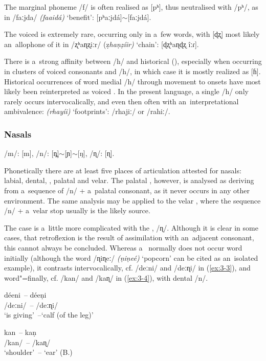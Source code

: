 The marginal phoneme /f/ is often realised as [pʰ], thus neutralised with /pʰ/, as in /faːjda/ \textit{(faaidá)} `benefit': [pʰaːjdá]$\sim$[faːjdá].


The voiced   is extremely rare, occurring only in a~few words, with [ɖʐ] most likely an~allophone of it in /ʐʰaɳʐiːr/ (ẓ\textit{haṇẓíir)} `chain': [ɖʐʰaɳɖʐ îːɾ]. 


There is a~strong affinity between /h/ and historical  (), especially when occurring in clusters of voiced consonants and /h/, in which case it is mostly realized as [ɦ]. Historical occurrences of word medial /h/ through movement to  onsets have most likely been reinterpreted as voiced . In the present language, a single /h/ only rarely occurs intervocalically, and even then often with an~interpretational ambivalence: \textit{(rhayíi)} `footprints': /rhajiː/ or /rahiː/.


\subsubsection*{Nasals}

/m/: [m], /n/: [n̪]$\sim${}[ɲ]$\sim$[ŋ], /ɳ/: [ɳ].


Phonetically there are at least five places of articulation attested for nasals: labial, dental, , palatal and velar. The palatal , however, is analysed as deriving from a~sequence of /n/ + a~palatal consonant, as it never occurs in any other environment. The same analysis may be applied to the velar , where the sequence /n/ + a~velar stop usually is the likely source.


The case is a~little more complicated with the  , /ɳ/. Although it is clear in some cases, that retroflexion is the result of assimilation with an~adjacent  consonant, this cannot always be concluded. Whereas a~  normally does not occur word initially (although the word /ɳiɳeː/ \textit{(ṇiṇeé)} `popcorn' can be cited as an~isolated example), it contrasts intervocalically, cf. /deːni/ and /deːɳi/ in (\ref{ex:3-3}), and word"=finally, cf. /kan/ and /kaɳ/ in (\ref{ex:3-4}), with dental /n/. 

\begin{exe}
\ex
\label{ex:3-3}
\gll déeni~-- déeṇi \\
/deːni/~-- /deːɳi/ \\
\glt `is giving'~--`calf (of the leg)' 

\ex
\label{ex:3-4}
\gll kan~-- kaṇ \\
/kan/~-- /kaɳ/ \\
\glt `shoulder'~-- `ear' (B.)
\end{exe}

